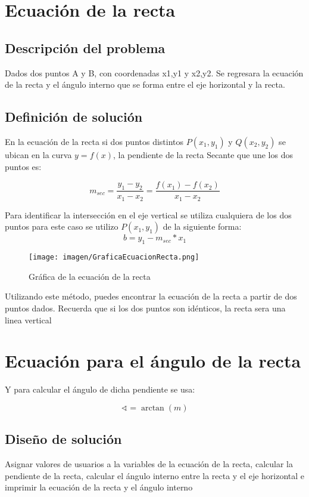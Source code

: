 \section{Ecuación de la recta }
\subsection{Descripción del problema}
Dados dos puntos A y B, con coordenadas x1,y1 y x2,y2. Se regresara la ecuación de la recta y el ángulo interno que se forma entre el eje horizontal y la recta.
\subsection{Definición de solución}
En la ecuación de la recta si dos puntos distintos $P(x_{1},y_{1})$ y $Q(x_{2},y_{2})$ se ubican en la curva $y=f(x)$, la pendiente de la recta Secante que une los dos puntos es:

\begin{equation}
    m_{sec} = \frac{y_{1}-y_{2}}{x_{1}-x_{2}} = \frac{f(x_{1})-f(x_{2})}{x_{1}-x_{2}}
\end{equation}

Para identificar la intersección en el eje vertical se utiliza cualquiera de los dos puntos para este caso se utilizo $P(x_{1},y_{1})$ de la siguiente forma: 
\begin{equation}
    b = y_{1} - m_{sec} * x_{1} 
\end{equation}

\begin{figure}[h!]
    \centerline{\texttt{[image: imagen/GraficaEcuacionRecta.png]}}
    \caption{Gráfica de la ecuación de la recta}
    \label{fig}
\end{figure}

Utilizando este método, puedes encontrar la ecuación de la recta a partir de dos puntos dados. Recuerda que si los dos puntos son idénticos, la recta sera una linea vertical\cite{articuloRecta}
\section{Ecuación para el ángulo de la recta}
Y para calcular el ángulo de dicha pendiente se usa: 

\begin{equation}
    \sphericalangle=\arctan(m)
\end{equation}
\subsection{Diseño de solución}
Asignar valores de usuarios a la variables de la ecuación de la recta, calcular la pendiente de la recta, calcular el ángulo interno entre la recta y el eje horizontal e imprimir la ecuación de la recta y el ángulo interno
